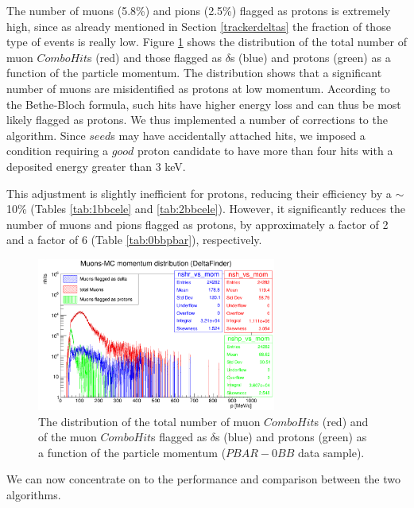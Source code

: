 The number of muons (5.8\%) and pions (2.5\%) 
flagged as protons is extremely high, since as already 
mentioned in Section \ref{trackerdeltas} the fraction 
of those type of events is really low. 
Figure \ref{fig:0pbarbefore} shows the  
distribution of the total 
number of muon $ComboHit$s (red) 
and those flagged as $\delta$s (blue) 
and protons (green) as a function 
of the particle momentum. 
The distribution shows that a significant number of 
muons are misidentified 
as protons at low momentum. 
According to the Bethe-Bloch formula, 
such hits have 
higher energy loss and can thus be 
most likely flagged as 
protons. We thus implemented a 
number of corrections to the algorithm. 
Since $seed$s may have 
accidentally attached hits, we imposed a 
condition requiring a $good$ proton 
candidate to have more than four 
hits with a deposited energy greater than 3 keV.

This adjustment is slightly inefficient 
for protons, reducing their 
efficiency by a $\sim$10\% 
(Tables \ref{tab:1bbcele} and \ref{tab:2bbcele}). 
However, it significantly reduces the 
number of muons and pions flagged as 
protons, by approximately 
a factor of 2 and a factor of 6 
(Table \ref{tab:0bbpbar}), respectively.

 \begin{figure}[!h]
            \centering
            \includegraphics[width =0.7\textwidth]{figures/png/Screenshot_20240805_222923.png}
        \caption[The  
        distribution of the total 
        and flagged number of muon 
        $ComboHit$s as a function of the particle momentum.]{The  
        distribution of the total number of 
        muon $ComboHit$s 
        (red) and of the muon $ComboHit$s 
        flagged as $\delta$s (blue) 
        and protons (green) as a function of the particle momentum ($PBAR-0BB$ data sample). }
           \label{fig:0pbarbefore}
\end{figure}

We can now concentrate on to the 
performance and comparison 
between the two algorithms.


